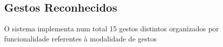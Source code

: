 \documentclass{report}
\begin{document}

\subsection{Gestos Reconhecidos}

O sistema implementa num total 15 gestos distintos organizados por funcionalidade referentes à modalidade de gestos
\end{document}
